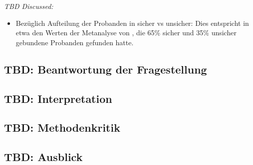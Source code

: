 \textit{TBD Discussed:}
\begin{itemize}
    \item Bezüglich Aufteilung der Probanden in sicher vs unsicher: Dies entspricht in etwa den Werten der Metanalyse von , die 65\% sicher und 35\% unsicher gebundene Probanden gefunden hatte.
\end{itemize}


\subsection{TBD: Beantwortung der Fragestellung} \label{sec:BeantwortungFragestellung}

\subsection{TBD: Interpretation} \label{sec:Interpretation}

\subsection{TBD: Methodenkritik} \label{sec:Methodenkritik}

\subsection{TBD: Ausblick} \label{sec:Ausblick}